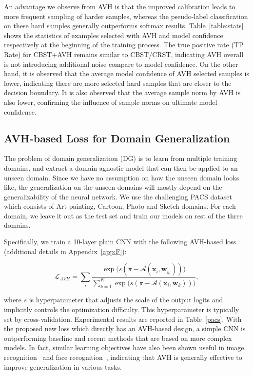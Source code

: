 An advantage we observe from AVH is that the improved calibration leads to more frequent sampling of harder samples, whereas the pseudo-label classification on these hard samples generally outperforms softmax results. Table~\ref{table:stats} shows the statistics of examples selected with AVH and model confidence respectively at the beginning of the training process. The true positive rate (TP Rate) for CBST+AVH remains similar to CBST/CRST, indicating AVH overall is not introducing additional noise compare to model confidence. On the other hand, it is observed that the average model confidence of AVH selected samples is lower, indicating there are more selected hard samples that are closer to the decision boundary. It is also observed that the average sample norm by AVH is also lower, confirming the influence of sample norms on ultimate model confidence.

\subsection{AVH-based Loss for Domain Generalization}
\label{sec:DG}
The problem of domain generalization (DG) is to learn from multiple training domains, and extract a domain-agnostic model that can then be applied to an unseen domain. Since we have no assumption on how the unseen domain looks like, the generalization on the unseen domains will mostly depend on the generalizability of the neural network. We use the challenging PACS dataset~\cite{li2017deeper} which consists of Art painting, Cartoon, Photo and Sketch domains. For each domain, we leave it out as the test set and train our models on rest of the three domains.

Specifically, we train a 10-layer plain CNN with the following AVH-based loss (additional details in Appendix~\ref{app:F}):

\begin{small}

\begin{equation}\label{avh_prob}
\mathcal{L}_{AVH} = \sum_i\frac{\exp\big(s(\pi - \mathcal{A}(\mathbf{x}_i,\mathbf{w}_{y_i}))\big)}{\sum_{k=1}^{K} \exp\big(s(\pi - \mathcal{A}(\mathbf{x}_i, \mathbf{w}_k))\big)},
\end{equation}

\end{small}

where $s$ is hyperparameter that adjusts the scale of the output logits and implicitly controls the optimization difficulty. This hyperparameter is typically set by cross-validation. Experimental results are reported in Table~\ref{pacs}. With the proposed new loss which directly has an AVH-based design, a simple CNN is outperforming baseline and recent methods that are based on more complex models. In fact, similar learning objectives have also been shown useful in image recognition~\cite{liu2017deep} and face recognition~\cite{wang2017normface,ranjan2017l2}, indicating that AVH is generally effective to improve generalization in various tasks.

